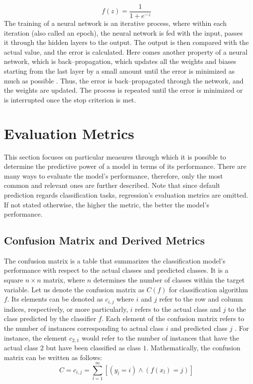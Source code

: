 \begin{equation}
     f(z) = \frac{1}{1+e^{-z}}
\end{equation}
The training of a neural network is an iterative process, where within each iteration (also called an epoch), the neural network is fed with the input, passes it through the hidden layers to the output. The output is then compared with the actual value, and the error is calculated.
Here comes another property of a neural network, which is back--propagation, which updates all the weights and biases starting from the last layer by a small amount until the error is minimized as much as possible \citep{ayyadevara2018pro}. Thus, the error is back--propagated through the network, and the weights are updated. The process is repeated until the error is minimized or is interrupted once the stop criterion is met.


\section{Evaluation Metrics}
\label{sec:evaltheory}

This section focuses on particular measures through which it is possible to determine the predictive power of a model in terms of its performance.
There are many ways to evaluate the model's performance, therefore, only the most common and relevant ones are further described.
Note that since default prediction regards classification tasks, regression's evaluation metrics are omitted.
If not stated otherwise, the higher the metric, the better the model's performance.
\subsection{Confusion Matrix and Derived Metrics}


The confusion matrix is a table that summarizes the classification model's performance with respect to the actual classes and predicted classes.
It is a square $n \times n$ matrix, where $n$ determines the number of classes within the target variable.
Let us denote the confusion matrix as $C\left(f\right)$ for classification algorithm $f$.
Its elements can be denoted as $c_{i,j}$ where $i$ and $j$ refer to the row and column indices, respectively, or more particularly, $i$ refers to the actual class and $j$ to the class predicted by the classifier $f$.
Each element of the confusion matrix refers to the number of instances corresponding to actual class $i$ and predicted class $j$ \citep{japkowicz2011evaluating}. For instance, the element $c_{2,1}$ would refer to the number of instances that have the actual class $2$ but have been classified as class $1$.
Mathematically, the confusion matrix can be written as follows:
\begin{equation}\label{eq}
C = {c_{i,j} = \sum_{l=1}^{m}[(y_l=i) \land (f(x_l)=j)]}
\end{equation}

